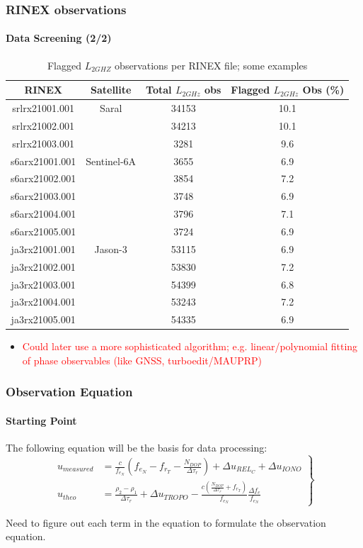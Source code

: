 \documentclass{beamer}
\newcommand{\aitem}{\item[\textasteriskcentered]}
\begin{document}
\begin{frame}\frametitle{RINEX observations}\framesubtitle{Data Screening (2/2)}
\begin{table}
\caption{Flagged $L_{2GHZ}$ observations per RINEX file; some examples}
\label{tab:table}
{\tiny
\begin{tabular}{|c|c|c|c|}
\hline \hline
  RINEX & Satellite & Total $L_{2GHz}$ obs & Flagged $L_{2GHz}$ Obs (\%) \\
  \hline
  srlrx21001.001 & Saral & 34153 & 10.1 \\
  srlrx21002.001 && 34213 & 10.1 \\
  srlrx21003.001 && 3281 & 9.6 \\
  s6arx21001.001 & Sentinel-6A & 3655 & 6.9 \\
  s6arx21002.001 && 3854 & 7.2 \\
  s6arx21003.001 && 3748 & 6.9 \\
  s6arx21004.001 && 3796 & 7.1 \\
  s6arx21005.001 && 3724 & 6.9 \\
  ja3rx21001.001 & Jason-3 & 53115 & 6.9 \\
  ja3rx21002.001 && 53830  & 7.2 \\
  ja3rx21003.001 && 54399 & 6.8 \\
  ja3rx21004.001 && 53243 & 7.2 \\
  ja3rx21005.001 && 54335 & 6.9 \\
\hline\hline
\end{tabular}
}

\begin{itemize}
  \aitem \textcolor{red}{Could later use a more sophisticated algorithm; e.g. linear/polynomial fitting 
  of phase observables (like GNSS, turboedit/MAUPRP)}
\end{itemize}
\end{table}


\end{frame}

\begin{frame}\frametitle{Observation Equation}\framesubtitle{Starting Point}
  The following equation \cite{lemoine-2016} will be the basis for data processing:
  \begin{equation*}
    \label{eq:lem17}
    \left.\begin{aligned}
        u_{measured} & = \frac{c}{f_{e_N}} 
          (f_{e_N} - f_{r_T}
            - \frac{N_{DOP}}{\Delta\tau_r}) 
          + \Delta u_{{REL}_C} 
          + \Delta u_{IONO}\\
        u_{theo} &= \frac{\rho_2 - \rho_1}{\Delta\tau_r} 
          + \Delta u_{TROPO} 
          - \frac{c(\frac{N_{DOP}}{\Delta\tau_r} 
          + f_{r_T})}{f_{e_N}} 
            \frac{\Delta f_e}{f_{e_N}}
    \end{aligned}
\right\}
\end{equation*}

Need to figure out each term in the equation to formulate the observation equation.
\end{frame}
\end{document}
